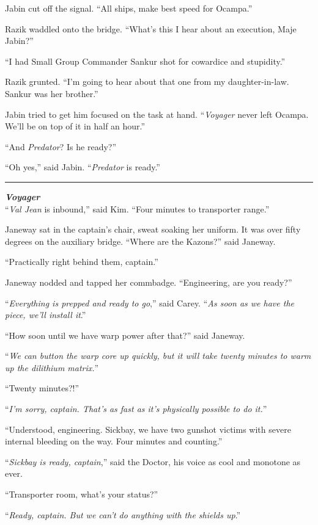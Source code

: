 \documentclass[twoside,letterpaper,12pt]{memoir}
\begin{document}
Jabin cut off the signal. ``All ships, make best speed for Ocampa.''

Razik waddled onto the bridge. ``What's this I hear about an execution, Maje Jabin?''

``I had Small Group Commander Sankur shot for cowardice and stupidity.''

Razik grunted. ``I’m going to hear about that one from my daughter-in-law. Sankur was her brother.''

Jabin tried to get him focused on the task at hand. ``\textit{Voyager} never left Ocampa. We'll be on top of it in half an hour.''

``And \textit{Predator}? Is he ready?''

``Oh yes,'' said Jabin. ``\textit{Predator} is ready.''

\fancybreak{\rule{3cm}{0.4 pt}}
\noindent\textit{\textbf{Voyager}}\\

``\textit{Val Jean} is inbound,'' said Kim. ``Four minutes to transporter range.''

Janeway sat in the captain's chair, sweat soaking her uniform. It was over fifty degrees on the auxiliary bridge. ``Where are the Kazons?'' said Janeway.

``Practically right behind them, captain.''

Janeway nodded and tapped her commbadge. ``Engineering, are you ready?''

``\textit{Everything is prepped and ready to go},'' said Carey. ``\textit{As soon as we have the piece, we'll install it}.''

``How soon until we have warp power after that?'' said Janeway.

``\textit{We can button the warp core up quickly, but it will take twenty minutes to warm up the dilithium matrix.}''

``Twenty minutes?!''

``\textit{I'm sorry, captain. That's as fast as it's physically possible to do it.}''

``Understood, engineering. Sickbay, we have two gunshot victims with severe internal bleeding on the way. Four minutes and counting.''

``\textit{Sickbay is ready, captain},'' said the Doctor, his voice as cool and monotone as ever.

``Transporter room, what's your status?''

``\textit{Ready, captain. But we can't do anything with the shields up}.''
\end{document}

